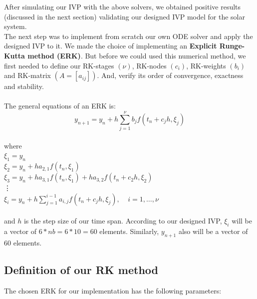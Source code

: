 \documentclass[a4paper]{article}
\begin{document}
After simulating our IVP with the above solvers, we obtained positive results (discussed in the next section) validating our designed IVP model for the solar system.\\

The next step was to implement from scratch our own ODE solver and apply the designed IVP to it. We made the choice of implementing an \textbf{Explicit Runge-Kutta method (ERK)}. But before we could used this numerical method, we first needed to define our RK-stages $(\nu)$, RK-nodes $(c_{i})$, RK-weights $(b_{i})$ and RK-matrix $(A=[a_{ij}])$. And, verify its order of convergence, exactness and stability.
\\\\The general equations of an ERK is:\\
$$y_{n+1}=y_{n}+h\sum_{j=1}^{\nu}b_{j}f(t_n+c_{j}h,\xi_{j})$$
\\where\\  
\indent$\xi_{1}=y_{n}$\\
\indent$\xi_{2}=y_{n}+ha_{2,1}f(t_{n},\xi_{1})$\\
\indent$\xi_{3}=y_{n}+ha_{3,1}f(t_{n},\xi_{1})+ha_{3,2}f(t_{n}+c_{2}h,\xi_{2})$\\
\indent\;\;\;\;\;\vdots\\
\indent$\xi_{i}=y_{n}+h\sum_{j=1}^{i-1}a_{i,j}f(t_n+c_{j}h,\xi_{j}),\;\;\;\;i=1,\ldots,\nu$\\
\\and $h$ is the step size of our time span. According to our designed IVP, $\xi_{i}$ will be a vector of $6*nb = 6*10=60$ elements. Similarly, $y_{n+1}$ also will be a vector of 60 elements.

\subsection{Definition of our RK method}
The chosen ERK for our implementation has the following parameters:
\end{document}
